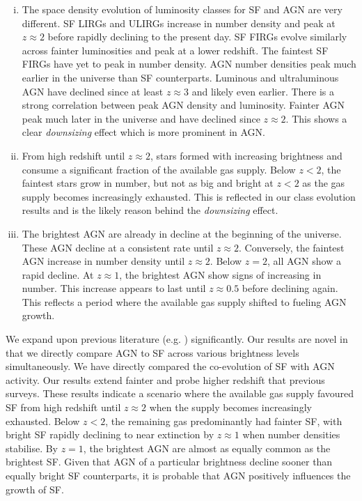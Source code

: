 \begin{enumerate}[(i)]
    \item The space density evolution of luminosity classes for SF and AGN are very different. SF LIRGs and ULIRGs increase in number density and peak at $z \approx 2$ before rapidly declining to the present day. SF FIRGs evolve similarly across fainter luminosities and peak at a lower redshift. The faintest SF FIRGs have yet to peak in number density. AGN number densities peak much earlier in the universe than SF counterparts. Luminous and ultraluminous AGN have declined since at least $z \approx 3$ and likely even earlier. There is a strong correlation between peak AGN density and luminosity. Fainter AGN peak much later in the universe and have declined since $z \approx 2$. This shows a clear \textit{downsizing} effect which is more prominent in AGN.

    \item From high redshift until $z\approx2$, stars formed with increasing brightness and consume a significant fraction of the available gas supply. Below $z<2$, the faintest stars grow in number, but not as big and bright at $z<2$ as the gas supply becomes increasingly exhausted. This is reflected in our class evolution results and is the likely reason behind the \textit{downsizing} effect.

    \item The brightest AGN are already in decline at the beginning of the universe. These AGN decline at a consistent rate until $z\approx2$. Conversely, the faintest AGN increase in number density until $z\approx2$. Below $z=2$, all AGN show a rapid decline. At $z\approx1$, the brightest AGN show signs of increasing in number. This increase appears to last until $z\approx0.5$ before declining again. This reflects a period where the available gas supply shifted to fueling AGN growth.
\end{enumerate}

We expand upon previous literature (e.g. \citealp{rodighiero_mid-_2010, gruppioni_herschel_2013, magnelli_deepest_2013}) significantly. Our results are novel in that we directly compare AGN to SF across various brightness levels simultaneously. We have directly compared the co-evolution of SF with AGN activity. Our results extend fainter and probe higher redshift that previous surveys. These results indicate a scenario where the available gas supply favoured SF from high redshift until $z\approx2$ when the supply becomes increasingly exhausted. Below $z<2$, the remaining gas predominantly had fainter SF, with bright SF rapidly declining to near extinction by $z\approx1$ when number densities stabilise. By $z=1$, the brightest AGN are almost as equally common as the brightest SF. Given that AGN of a particular brightness decline sooner than equally bright SF counterparts, it is probable that AGN positively influences the growth of SF.
